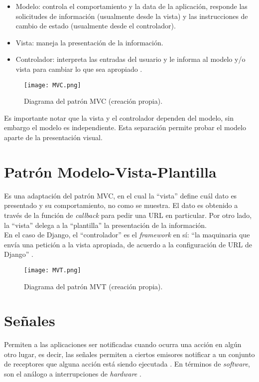 \begin{itemize}
    \item Modelo: controla el comportamiento y la data de la aplicación, responde las solicitudes de información (usualmente desde la vista) y las instrucciones de cambio de estado (usualmente desde el controlador).
    \item Vista: maneja la presentación de la información.
    \item Controlador: interpreta las entradas del usuario y le informa al modelo y/o vista para cambiar lo que sea apropiado \cite{MVC1}.
\end{itemize}

\begin{figure}[h]
\centering
\texttt{[image: MVC.png]}
\caption{Diagrama del patrón MVC (creación propia).}
\label{fig:figura3.1}
\end{figure}

Es importante notar que la vista y el controlador dependen del modelo, sin embargo el modelo es independiente. Esta separación permite probar el modelo aparte de la presentación visual.

\section{Patrón Modelo-Vista-Plantilla}

Es una adaptación del patrón MVC, en el cual la “vista” define cuál dato es presentado y su comportamiento, no como se muestra. El dato es obtenido a través de la función de \textit{callback} para pedir una URL en particular. Por otro lado, la “vista” delega a la “plantilla”  la presentación de la información.\\

En el caso de Django, el “controlador” es el \textit{framework} en sí: “la maquinaria que envía una petición a la vista apropiada, de acuerdo a la configuración de URL de Django” \cite{MVT}.

\begin{figure}[h]
\centering
\texttt{[image: MVT.png]}
\caption{Diagrama del patrón MVT (creación propia).}
\label{fig:figura3.2}
\end{figure}

\section{Señales}

Permiten a las aplicaciones ser notificadas cuando ocurra una acción en algún otro lugar, es decir, las señales permiten a ciertos emisores notificar a un conjunto de receptores que alguna acción está siendo ejecutada \cite{Signals}. En términos de \textit{software}, son el análogo a interrupciones de \textit{hardware} \cite{Senales}.


